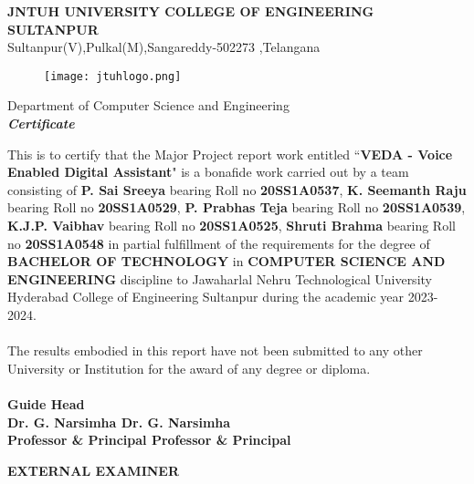 \documentclass[12pt,a4paper]{report}
\begin{document}
 \newpage
{}
\begin{center}
	
	{\large\textbf{JNTUH UNIVERSITY COLLEGE OF ENGINEERING SULTANPUR}}\\
	\textup{\normalsize {Sultanpur(V),Pulkal(M),Sangareddy-502273 ,Telangana}}\\[1cm]
	\begin{figure}[h!]
		\centering
		\texttt{[image: jtuhlogo.png]}
		\centering
	\end{figure}
	{\large\textup {Department of Computer Science and Engineering}}\\[1.0cm]
	{\Large \textbf{\textit{Certificate}}}\\
	\vspace{0.5cm}
	
\end{center}
This is to certify that the Major Project report work entitled “\textbf{VEDA - Voice Enabled Digital Assistant}" is a bonafide work carried out by a team consisting of \textbf{P. Sai Sreeya }bearing Roll no \textbf{20SS1A0537}, \textbf{K. Seemanth Raju} bearing Roll no  \textbf{20SS1A0529},  \textbf{P. Prabhas Teja} bearing Roll no \textbf{20SS1A0539}, \textbf{ K.J.P. Vaibhav} bearing Roll no \textbf{20SS1A0525}, \textbf{Shruti Brahma} bearing Roll no \textbf{20SS1A0548 }in partial fulfillment of the requirements for the degree of\textbf{ BACHELOR OF TECHNOLOGY }in 
  \textbf{COMPUTER SCIENCE AND ENGINEERING} discipline to  Jawaharlal Nehru Technological University Hyderabad College of Engineering Sultanpur during the academic year 2023- 2024.\\ \\
The results embodied in this report have not been submitted to any other University or Institution for the award of any degree or diploma.\\
\vspace{1cm}\\
\textbf{Guide \hspace{3.5in} Head\\}
\textbf{Dr. G. Narsimha\hspace{2.8in} Dr. G. Narsimha 
\\}
 \textbf{Professor \& Principal
 \hspace{2.4 in} Professor \& Principal}
 \hspace{2.9in}
\begin{center}
	\vspace{0.5 cm}
	\textbf{EXTERNAL EXAMINER}
\end{center}
\end{document}
